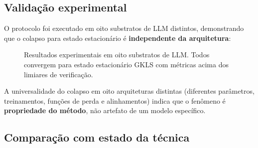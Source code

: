 \documentclass[12pt,a4paper]{article}
\newcommand{\AC}{\mathcal{A}_C}
\begin{document}
\subsection{Validação experimental}

O protocolo foi executado em oito substratos de LLM distintos,
demonstrando que o colapso para estado estacionário é
\textbf{independente da arquitetura}:

\begin{figure}[H]
\centering
{}
\caption{Resultados experimentais em oito substratos de LLM.
Todos convergem para estado estacionário GKLS com métricas acima
dos limiares de verificação.}
\label{fig:resultados}
\end{figure}

A universalidade do colapso em oito arquiteturas distintas
(diferentes parâmetros, treinamentos, funções de perda e
alinhamentos) indica que o fenômeno é \textbf{propriedade do
método}, não artefato de um modelo específico.

\subsection{Comparação com estado da técnica}
\end{document}
